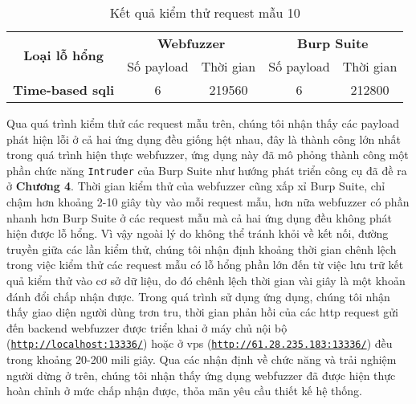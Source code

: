\FloatBarrier
\begin{table}[ht]
    \centering
    \caption{Kết quả kiểm thử request mẫu 10}
    \label{tab:testing-result-10}
    \begin{tabular}[ht]{ccccc}
        \toprule[1pt]\midrule[0.3pt]
            \multirow{2}{*}{\textbf{Loại lỗ hổng}}&\multicolumn{2}{c}{\textbf{Webfuzzer}}&\multicolumn{2}{c}{\textbf{Burp Suite}}\\
            \cmidrule(lr){2-3}\cmidrule(lr){4-5}{}&Số payload&Thời gian&Số payload&Thời gian\\
        \midrule[0.3pt]
            \textbf{Time-based \acrshort{sqli}}&6&219560&6&212800\\
        \midrule[0.3pt]\bottomrule[1pt]
    \end{tabular}
\end{table}
\FloatBarrier
Qua quá trình kiểm thử các request mẫu trên, chúng tôi nhận thấy các payload phát hiện lỗi ở cả hai ứng dụng đều giống hệt nhau, đây là thành công lớn nhất trong quá trình hiện thực webfuzzer, ứng dụng này đã mô phỏng thành công một phần chức năng \texttt{Intruder} của Burp Suite như hướng phát triển công cụ đã đề ra ở \textbf{Chương 4}. Thời gian kiểm thử của webfuzzer cũng xấp xỉ Burp Suite, chỉ chậm hơn khoảng 2-10 giây tùy vào mỗi request mẫu, hơn nữa webfuzzer có phần nhanh hơn Burp Suite ở các request mẫu mà cả hai ứng dụng đều không phát hiện được lỗ hổng. Vì vậy ngoài lý do không thể tránh khỏi về kết nối, đường truyền giữa các lần kiểm thử, chúng tôi nhận định khoảng thời gian chênh lệch trong việc kiểm thử các request mẫu có lỗ hổng phần lớn đến từ việc lưu trữ kết quả kiểm thử vào cơ sở dữ liệu, do đó chênh lệch thời gian vài giây là một khoản đánh đổi chấp nhận được. Trong quá trình sử dụng ứng dụng, chúng tôi nhận thấy giao diện người dùng trơn tru, thời gian phản hồi của các \acrshort{http} request gửi đến backend webfuzzer được triển khai ở máy chủ nội bộ (\href{http://localhost:13336/}{\texttt{http://localhost:13336/}}) hoặc ở \acrshort{vps} (\href{http://61.28.235.183:13336/}{\texttt{http://61.28.235.183:13336/}}) đều trong khoảng 20-200 mili giây. Qua các nhận định về chức năng và trải nghiệm người dừng ở trên, chúng tôi nhận thấy ứng dụng webfuzzer đã được hiện thực hoàn chỉnh ở mức chấp nhận được, thỏa mãn yêu cầu thiết kế hệ thống.